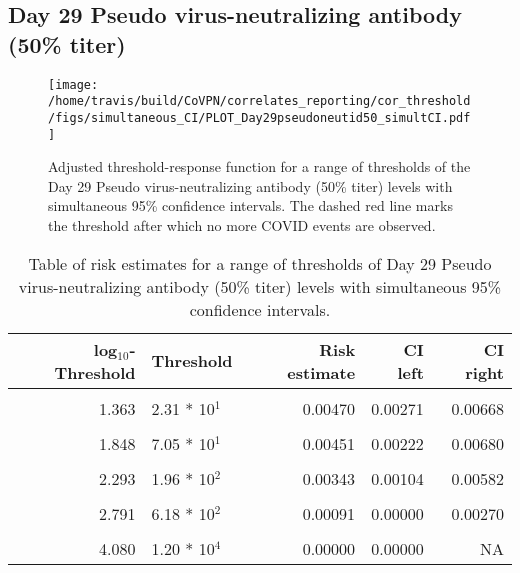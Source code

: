 \documentclass[]{book}
\theoremstyle{definition}
\theoremstyle{definition}
\theoremstyle{definition}
\newcommand{\1}{\mathbbm{1}}
\begin{document}
\newpage

\newpage

\newpage

\hypertarget{day-29-pseudo-virus-neutralizing-antibody-50-titer-2}{%
\subsection{Day 29 Pseudo virus-neutralizing antibody (50\% titer)}\label{day-29-pseudo-virus-neutralizing-antibody-50-titer-2}}

\begin{figure}[H]
\centering
\texttt{[image: /home/travis/build/CoVPN/correlates\_reporting/cor\_threshold/figs/simultaneous\_CI/PLOT\_Day29pseudoneutid50\_simultCI.pdf]}
\caption{Adjusted threshold-response function for a range of thresholds of the
  Day 29 Pseudo virus-neutralizing antibody (50\% titer) levels with simultaneous 95\% confidence intervals. The dashed red line marks the threshold after which no more COVID events are observed. }
\end{figure}
\begin{table}[!h]

\caption{\label{tab:unnamed-chunk-391}Table of risk estimates for a range of thresholds of Day 29 Pseudo virus-neutralizing antibody (50\% titer) levels with simultaneous 95\% confidence intervals.}
\centering
\begin{tabular}[t]{rlrrr}
\toprule
log$_{10}$-Threshold & Threshold & Risk estimate & CI left & CI right\\
\midrule
\cellcolor{gray!6}{0.699} & \cellcolor{gray!6}{5.00 * 10$^0$} & \cellcolor{gray!6}{0.00585} & \cellcolor{gray!6}{0.00382} & \cellcolor{gray!6}{0.00788}\\
1.363 & 2.31 * 10$^1$ & 0.00470 & 0.00271 & 0.00668\\
\cellcolor{gray!6}{1.628} & \cellcolor{gray!6}{4.25 * 10$^1$} & \cellcolor{gray!6}{0.00469} & \cellcolor{gray!6}{0.00254} & \cellcolor{gray!6}{0.00683}\\
1.848 & 7.05 * 10$^1$ & 0.00451 & 0.00222 & 0.00680\\
\cellcolor{gray!6}{2.078} & \cellcolor{gray!6}{1.20 * 10$^2$} & \cellcolor{gray!6}{0.00399} & \cellcolor{gray!6}{0.00168} & \cellcolor{gray!6}{0.00630}\\
2.293 & 1.96 * 10$^2$ & 0.00343 & 0.00104 & 0.00582\\
\cellcolor{gray!6}{2.537} & \cellcolor{gray!6}{3.44 * 10$^2$} & \cellcolor{gray!6}{0.00143} & \cellcolor{gray!6}{0.00000} & \cellcolor{gray!6}{0.00323}\\
2.791 & 6.18 * 10$^2$ & 0.00091 & 0.00000 & 0.00270\\
\cellcolor{gray!6}{3.109} & \cellcolor{gray!6}{1.29 * 10$^3$} & \cellcolor{gray!6}{0.00199} & \cellcolor{gray!6}{0.00000} & \cellcolor{gray!6}{0.00601}\\
4.080 & 1.20 * 10$^4$ & 0.00000 & 0.00000 & NA\\
\bottomrule
\end{tabular}
\end{table}
\end{document}
